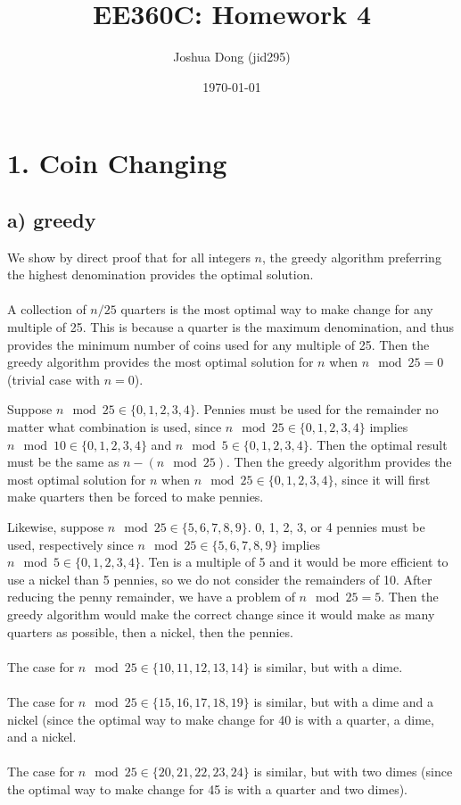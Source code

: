 \documentclass{article}
\begin{document}
\title{EE360C: Homework 4}
\author{Joshua Dong (jid295)}
\date{\today}
\maketitle

\section*{1. Coin Changing}
\subsection*{a) greedy}
\begin{algorithmic}
\end{algorithmic}
We show by direct proof that for all integers $n$, the greedy algorithm
preferring the highest denomination provides the optimal solution.
\\\\
A collection of $n/25$ quarters is the most optimal way to make change for any
multiple of 25. This is because a quarter is the maximum denomination, and
thus provides the minimum number of coins used for any multiple of 25. Then
the greedy algorithm provides the most optimal solution for $n$ when
$n \mod 25 = 0$ (trivial case with $n = 0$).

Suppose
$n \mod 25 \in \{0, 1, 2, 3, 4\}$.
Pennies must be used for the remainder no matter what combination is used,
since
$n \mod 25 \in \{0, 1, 2, 3, 4\}$
implies
$n \mod 10 \in \{0, 1, 2, 3, 4\}$
and
$n \mod 5 \in \{0, 1, 2, 3, 4\}$.
Then the optimal result must be the same as $n - (n \mod 25)$. Then the greedy
algorithm provides the most optimal solution for $n$ when
$n \mod 25 \in \{0, 1, 2, 3, 4\}$, since it will first make quarters then
be forced to make pennies. 

Likewise, suppose
$n \mod 25 \in \{5, 6, 7, 8, 9\}$.
0, 1, 2, 3, or 4 pennies must be used, respectively since
$n \mod 25 \in \{5, 6, 7, 8, 9\}$
implies
$n \mod 5 \in \{0, 1, 2, 3, 4\}$.
Ten is a multiple of 5 and it would be more efficient to use a nickel than
5 pennies, so we do not consider the remainders of 10. After reducing the
penny remainder, we have a problem of $n \mod 25 = 5$. Then the greedy
algorithm would make the correct change since it would make as many
quarters as possible, then a nickel, then the pennies.
\\\\
The case for $n \mod 25 \in \{10, 11, 12, 13, 14\}$ is similar, but with a
dime.
\\\\
The case for $n \mod 25 \in \{15, 16, 17, 18, 19\}$ is similar, but with a
dime and a nickel (since the optimal way to make change for 40 is with a
quarter, a dime, and a nickel.
\\\\
The case for $n \mod 25 \in \{20, 21, 22, 23, 24\}$ is similar, but with two
dimes (since the optimal way to make change for 45 is with a quarter and two
dimes).
\end{document}
